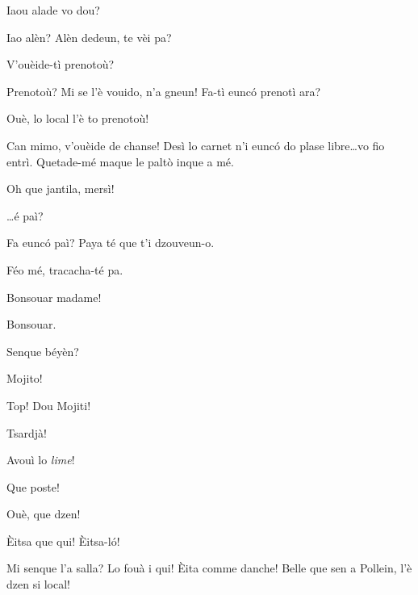 \begin{drama}
\Dorinaspeaks Iaou alade vo dou?

\Pierrespeaks Iao alèn? Alèn dedeun, te vèi pa?

\Dorinaspeaks V'ouèide-tì prenotoù?

\Pierrespeaks Prenotoù? Mi se l'è vouido, n'a gneun! Fa-tì eunc\'o prenotì ara?

\Dorinaspeaks Ouè, lo local l'è to prenotoù!

\Dorinaspeaks Can mimo, v'ouèide de chanse! Desì lo carnet n'i eunc\'o do plase libre\ldots vo fio entrì. Quetade-mé maque le palt\`o inque a mé.

\Pierrespeaks Oh que jantila, mersì!


\Dorinaspeaks \ldots é paì?

\Pierrespeaks Fa eunc\'o paì? Paya té que t'i dzouveun-o.

\Louisspeaks Féo mé, tracacha-té pa.


\Pierrespeaks{} Bonsouar madame!

\Bertaspeaks{} Bonsouar.

\Pierrespeaks{} Senque béyèn?

\Louisspeaks Mojito!

\Pierrespeaks Top!  Dou Mojiti!

\Louisspeaks Tsardjà!

\Pierrespeaks Avouì lo \textit{lime}!


\Louisspeaks{} Que poste!

\Pierrespeaks{} Ouè, que dzen!


\Louisspeaks{} \`Eitsa que qui! \`Eitsa-l\'o!


\Pierrespeaks Mi senque l'a salla? Lo fouà i qui! \`Eita comme danche! Belle que sen a Pollein, l'è dzen si local!


\end{drama}
